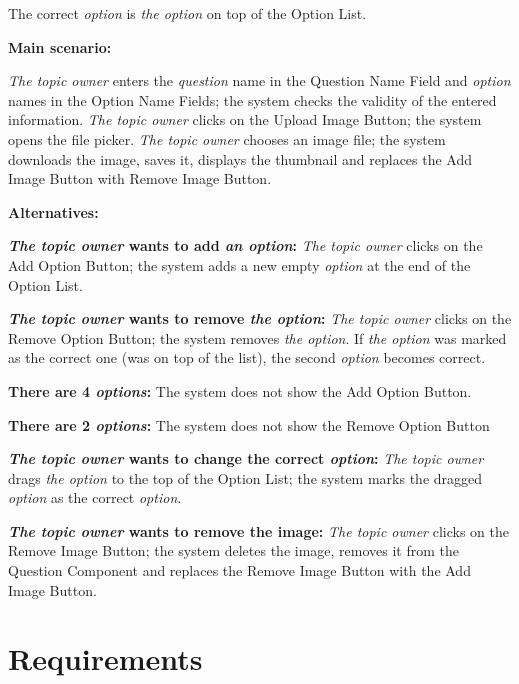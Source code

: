 \documentclass[
    english, %
]{VUMIFPSkursinis}
\begin{document}
The correct \textit{option} is \textit{the option} on top of the Option List.

\noindent\textbf{\fontsize{13}{15}\selectfont Main scenario:}

\textit{The topic owner} enters the \textit{question} name in the Question Name Field and \textit{option} names in the Option Name Fields; the system checks the validity of the entered information. \textit{The topic owner} clicks on the Upload Image Button; the system opens the file picker. \textit{The topic owner} chooses an image file; the system downloads the image, saves it, displays the thumbnail and replaces the Add Image Button with Remove Image Button.

\noindent\textbf{\fontsize{13}{15}\selectfont Alternatives:}

\textbf{\textit{The topic owner} wants to add \textit{an option}:} \textit{The topic owner} clicks on the Add Option Button; the system adds a new empty \textit{option} at the end of the Option List.

\textbf{\textit{The topic owner} wants to remove \textit{the option}:} \textit{The topic owner} clicks on the Remove Option Button; the system removes \textit{the option}. If \textit{the option} was marked as the correct one (was on top of the list), the second \textit{option} becomes correct.

\textbf{There are 4 \textit{options}:} The system does not show the Add Option Button.

\textbf{There are 2 \textit{options}:} The system does not show the Remove Option Button

\textbf{\textit{The topic owner} wants to change the correct \textit{option}:} \textit{The topic owner} drags \textit{the option} to the top of the Option List; the system marks the dragged \textit{option} as the correct \textit{option}.

\textbf{\textit{The topic owner} wants to remove the image:} \textit{The topic owner} clicks on the Remove Image Button; the system deletes the image, removes it from the Question Component and replaces the Remove Image Button with the Add Image Button.

\section{Requirements}
\end{document}
